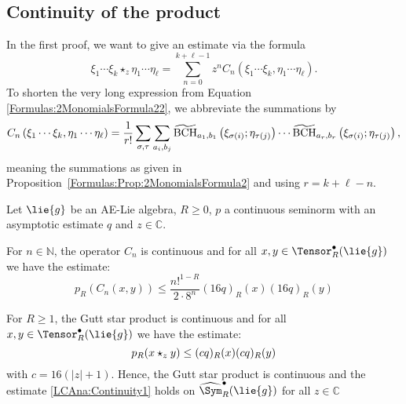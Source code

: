 \subsection{Continuity of the product}
In the first proof, we want to give an estimate via the formula
\begin{equation}
    \label{eq:GstarOfXisAndEtas}
    \xi_1 \cdots \xi_k \star_z \eta_1 \cdots \eta_{\ell}
    =
    \sum\limits_{n=0}^{k + \ell -1}
    z^n
    C_n (\xi_1 \cdots \xi_k, \eta_1 \cdots \eta_{\ell}).
\end{equation}
To shorten the very long expression from Equation 
\eqref{Formulas:2MonomialsFormula22}, we abbreviate the summations by
\begin{equation}
	\label{LCAna:ShorterSumsInLongProduct}
    C_n\left(
        \xi_1 \cdots \xi_k,
        \eta_1 \cdots \eta_{\ell}
    \right)
    =
    \frac{1}{r!}
    \sum\limits_{\sigma, \tau}
    \sum\limits_{a_i, b_j}
    \widetilde{\mathrm{BCH}}_{a_1, b_1}\left(\xi_{\sigma(i)}; \eta_{\tau(j)}\right)
    \cdots
    \widetilde{\mathrm{BCH}}_{a_r, b_r}\left(\xi_{\sigma(i)}; \eta_{\tau(j)}\right),
\end{equation}
meaning the summations as given in
Proposition~\ref{Formulas:Prop:2MonomialsFormula2} and 
using $r = k + \ell - n$.
\begin{theorem}
    \label{Thm:LCAna:Continuity1}%
    Let $\lie{g}$ be an AE-Lie algebra, $R \geq 0$, $p$ a continuous seminorm
    with an asymptotic estimate $q$ and $z \in \mathbb{C}$.
    \begin{theoremlist}
    	\item \label{item:CnOperatorEstimate}
    	For $n \in \mathbb{N}$, the operator $C_n$ is continuous and for all
    	$x, y \in \Tensor_R^{\bullet}(\lie{g})$ we have the estimate:
    	\begin{equation}
    		\label{LCAna:CnOperators}
    		p_R \left( C_n(x,y) \right)
			\leq
        	\frac{n!^{1 - R}}{2 \cdot 8^n}
        	(16 q)_R (x)
        	(16 q)_R (y)
    	\end{equation}
    	\item \label{item:LCAna:Continuity1}
    	For $R \geq 1$, the Gutt star product is continuous and for all
    	$x, y \in \Tensor_R^{\bullet}(\lie{g})$ we have the estimate:
	    \begin{equation}
	   	    \label{LCAna:Continuity1}
	        p_R(x \star_z y)
	        \leq
	        (c q)_R(x) (c q)_R(y)
	    \end{equation}
	    with $c = 16(|z| + 1)$. Hence, the Gutt star product is continuous and
	    the estimate \eqref{LCAna:Continuity1} holds on
	    $\widehat{\Sym}_R^\bullet(\lie{g})$ for all $z \in \mathbb{C}$
	\end{theoremlist}
\end{theorem}
